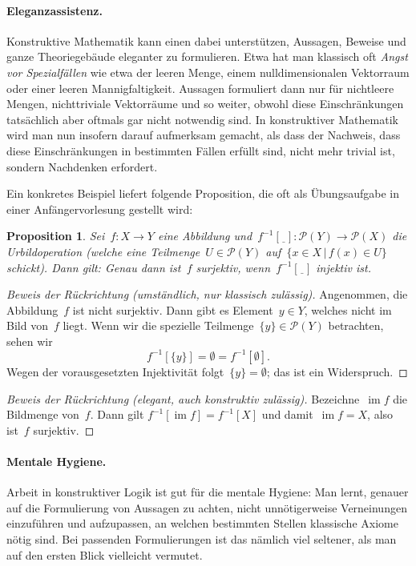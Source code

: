 \documentclass[a4paper,ngerman,12pt]{scrartcl}
\theoremstyle{definition}
\theoremstyle{plain}
\newtheorem{prop}[defn]{Proposition}
\theoremstyle{remark}
\renewcommand{\P}{\mathcal{P}}
\newcommand{\freist}{\underline{\ \ }}
\DeclareMathOperator{\im}{im}
\renewcommand{\_}{\mathpunct{.}\,}
\newcommand{\?}{\,{:}\,}
\begin{document}
\paragraph{Eleganzassistenz.}
Konstruktive Mathematik kann einen dabei unterstützen, Aussagen, Beweise und
ganze Theoriegebäude eleganter zu formulieren. Etwa hat man klassisch oft
\emph{Angst vor Spezialfällen} wie etwa der leeren Menge, einem
nulldimensionalen Vektorraum oder einer leeren Mannigfaltigkeit. Aussagen
formuliert dann nur für nichtleere Mengen, nichttriviale Vektorräume und so
weiter, obwohl diese Einschränkungen tatsächlich aber oftmals gar nicht
notwendig sind. In konstruktiver Mathematik wird man nun insofern darauf
aufmerksam gemacht, als dass der Nachweis, dass diese Einschränkungen in
bestimmten Fällen erfüllt sind, nicht mehr trivial ist, sondern Nachdenken
erfordert.

Ein konkretes Beispiel liefert folgende Proposition, die oft als Übungsaufgabe in
einer Anfängervorlesung gestellt wird:
\begin{prop}Sei~$f : X \to Y$ eine Abbildung und~$f^{-1}[\freist] : \P(Y) \to
\P(X)$ die Urbildoperation (welche eine Teilmenge~$U \in \P(Y)$ auf~$\{ x \in X
\,|\, f(x) \in U \}$ schickt). Dann gilt: Genau dann ist~$f$ surjektiv,
wenn~$f^{-1}[\freist]$ injektiv ist.
\end{prop}
\begin{proof}[Beweis der Rückrichtung (umständlich, nur klassisch zulässig)]
Angenommen, die Abbildung~$f$ ist nicht surjektiv. Dann gibt es Element~$y \in
Y$, welches nicht im Bild von~$f$ liegt. Wenn wir die spezielle
Teilmenge~$\{y\} \in \P(Y)$ betrachten, sehen wir
\[ f^{-1}[\{y\}] = \emptyset = f^{-1}[\emptyset]. \]
Wegen der vorausgesetzten Injektivität folgt~$\{y\} = \emptyset$; das ist ein
Widerspruch.\end{proof}
\begin{proof}[Beweis der Rückrichtung (elegant, auch konstruktiv zulässig)]
Bezeichne~$\im f$ die Bildmenge von~$f$. Dann gilt
$f^{-1}[\im f] = f^{-1}[X]$
und damit~$\im f = X$, also ist~$f$ surjektiv.\end{proof}

\paragraph{Mentale Hygiene.} Arbeit in konstruktiver Logik ist gut für die
mentale Hygiene: Man lernt, genauer auf die Formulierung von Aussagen zu
achten, nicht unnötigerweise Verneinungen einzuführen und aufzupassen, an
welchen bestimmten Stellen klassische Axiome nötig sind. Bei passenden
Formulierungen ist das nämlich viel seltener, als man auf den ersten Blick
vielleicht vermutet.
\end{document}
